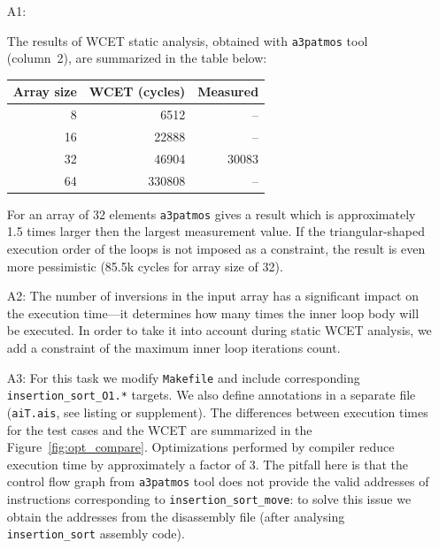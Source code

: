 \documentclass[12pt,a4paper,titlepage,oneside]{article}
\begin{document}
\begin{itemize}

\item[A1:]

The results of WCET static analysis, obtained with \texttt{a3patmos}
tool (column~2), are summarized in the table below:
\begin{center}
\begin{tabular}{r | r | r}
\hline
Array size & WCET (cycles) & Measured \\\hline
8  & 6512 & -- \\\hline
16 & 22888 & -- \\\hline
32 & 46904 & 30083 \\\hline
64 & 330808 & -- \\\hline
\end{tabular}
\end{center}

For an array of 32 elements \texttt{a3patmos} gives a result which is
approximately 1.5 times larger then the largest measurement value. 
If the triangular-shaped execution order of the loops is not
imposed as a constraint, the result is even more
pessimistic (85.5k cycles for array size of 32).

\item[A2:]
The number of inversions in the input array has a significant impact on
the execution time---it determines how many times the inner loop body will be executed.
In order to take it into
account during static WCET analysis, we add a
constraint of the maximum inner loop iterations count.

\item[A3:]
For this task we modify \texttt{Makefile} and include corresponding
\texttt{insertion\_sort\_O1.*} targets.
We also define annotations in a separate file (\texttt{aiT.ais}, see listing or supplement).
The differences between execution times for the test cases 
and the WCET are summarized in the Figure~\ref{fig:opt_compare}.
Optimizations performed by compiler  reduce execution
time by approximately a factor of 3. The pitfall here is
that the control flow graph from \texttt{a3patmos} tool does not provide 
the valid addresses of instructions corresponding to \texttt{insertion\_sort\_move}:
to solve this issue we obtain the addresses from the disassembly file
(after analysing \texttt{insertion\_sort} assembly code).



\end{itemize}
\end{document}

